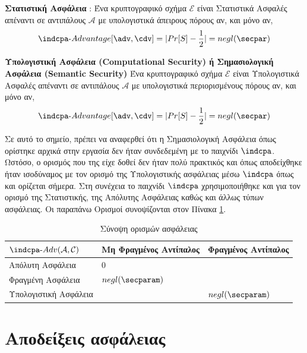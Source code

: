 \begin{definition}
\textbf{Στατιστική Ασφάλεια} : Ένα κρυπτογραφικό σχήμα $\mathcal{E}$ είναι Στατιστικά Ασφαλές απέναντι σε αντιπάλους $\mathcal{A}$ με υπολογιστικά άπειρους πόρους αν, και μόνο αν,
$$
\indcpa\text{-}Advantage[\adv, \cdv] = | Pr[S] - \dfrac{1}{2} | = negl(\secpar)
$$
\end{definition}

\begin{definition}
\textbf{Υπολογιστική Ασφάλεια (Computational Security) ή Σημασιολογική Ασφάλεια (Semantic Security)}
Ένα κρυπτογραφικό σχήμα $\mathcal{E}$ είναι Υπολογιστικά Ασφαλές απέναντι σε αντιπάλους $\mathcal{A}$ με υπολογιστικά περιορισμένους πόρους αν, και μόνο αν, 
$$
    \indcpa\text{-}Advantage[\adv, \cdv] = | Pr[S] - \dfrac{1}{2} | = negl(\secpar)
$$
\end{definition}

Σε αυτό το σημείο, πρέπει να αναφερθεί ότι η Σημασιολογική Ασφάλεια όπως ορίστηκε αρχικά στην εργασία \cite{10.1145/800070.802212} δεν ήταν συνδεδεμένη με το παιχνίδι $\indcpa$. Ωστόσο, ο ορισμός που της είχε δοθεί δεν ήταν πολύ πρακτικός και όπως αποδείχθηκε ήταν ισοδύναμος με τον ορισμό της Υπολογιστικής ασφάλειας μέσω $\indcpa$ όπως και ορίζεται σήμερα. Στη συνέχεια το παιχνίδι $\indcpa$ χρησιμοποιήθηκε και για τον ορισμό της Στατιστικής, της Απόλυτης Ασφάλειας καθώς και άλλως τύπων ασφάλειας.
Οι παραπάνω Ορισμοί συνοψίζονται στον Πίνακα \ref{security_notions_summary}.

\begin{table}[]
\begin{center}
\begin{tabular}{|l|l|l|}
\hline
$\indcpa\text{-}Adv(\mathcal{A}, \mathcal{C})$ & Μη Φραγμένος Αντίπαλος   & Φραγμένος Αντίπαλος      \\ \hline
Απόλυτη Ασφάλεια      & $0$                      & \cellcolor[HTML]{C0C0C0} \\ \hline
Φραγμένη Ασφάλεια     & $negl(\secparam)$          & \cellcolor[HTML]{C0C0C0} \\ \hline
Υπολογιστική Ασφάλεια & \cellcolor[HTML]{C0C0C0} & $negl(\secparam)$            \\ \hline
\end{tabular}
\caption{Σύνοψη ορισμών ασφάλειας}
\label{security_notions_summary}
\end{center}
\end{table}

\section{Αποδείξεις ασφάλειας}

